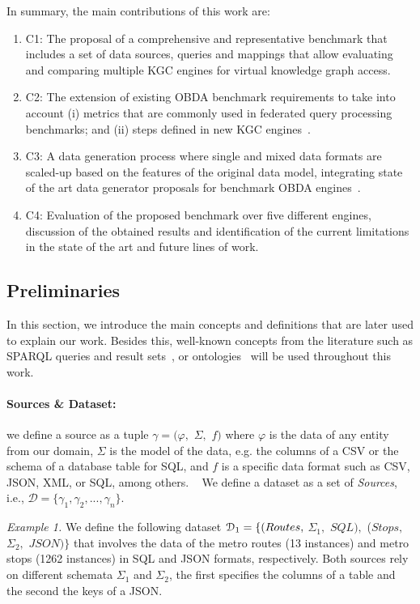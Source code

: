 In summary, the main contributions of this work are:
\begin{enumerate}
    \item C1: The proposal of a comprehensive and representative benchmark that includes a set of data sources, queries and mappings that allow evaluating and comparing multiple KGC engines for virtual knowledge graph access.
    \item C2: The extension of existing OBDA benchmark requirements to take into account (i) metrics that are commonly used in federated query processing benchmarks; and (ii) steps defined in new KGC engines~\citep{corcho2019towards}.
    \item C3: A data generation process where single and mixed data formats are scaled-up based on the features of the original data model, integrating state of the art data generator proposals for benchmark OBDA engines~\citep{lantivig}.
    \item C4: Evaluation of the proposed benchmark over five different engines, discussion of the obtained results and identification of the current limitations in the state of the art and future lines of work. 
\end{enumerate}


\subsection{Preliminaries}

In this section, we introduce the main concepts and definitions that are later used to explain our work. Besides this, well-known concepts from the literature such as SPARQL queries and result sets~\citep{w3c2013sparql}, or ontologies~\citep{mcguinness2004owl} will be used throughout this work.

\paragraph{\textbf{Sources \& Dataset:}} we define a source as a tuple $\gamma=(\varphi,$ $\Sigma ,$ $f)$ where $\varphi$ is the data of any entity from our domain, $\Sigma$ is the model of the data, e.g. the columns of a CSV or the schema of a database table for SQL, and $f$ is a specific data format such as CSV, JSON, XML, or SQL, among others.%
~ We define a dataset as a set of \textit{Sources}, i.e., $\mathcal{D}=\{\gamma_1,\gamma_2, ..., \gamma_n\}$. 

\textit{Example 1.} We define the following dataset $\mathcal{D}_{1}=\{(Rou\-tes,$ $\Sigma_1,$ $SQL),$ ($Stops,$ $\Sigma_2,$ $JSON)\}$ that involves the data of the metro routes (13 instances) and metro stops (1262 instances) in SQL and JSON formats, respectively. Both sources rely on different schemata $\Sigma_1$ and $\Sigma_2$, the first specifies the columns of a table and the second the keys of a JSON.

